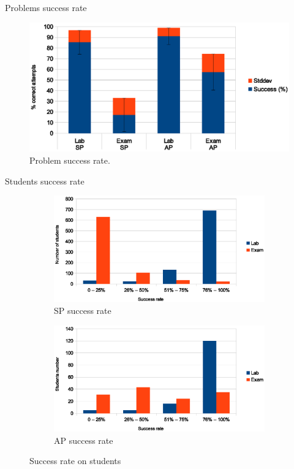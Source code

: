 \begin{frame}{Problems success rate}
    \begin{figure}
    \centering
        \includegraphics[width=.9\textwidth]{../code_usage/problems_success_rate}
        \caption{Problem success rate.}
        \label{fig:success_rate}
    \end{figure}
\end{frame}

\begin{frame}{Students success rate}
\begin{figure}
\centering
\begin{subfigure}{.5\textwidth}
  \centering
  \includegraphics[width=\linewidth]{../code_usage/sp_success_rate}
  \caption{SP success rate}
  \label{fig:sp_success_rate}
\end{subfigure}%
\begin{subfigure}{.5\textwidth}
  \centering
  \includegraphics[width=\linewidth]{../code_usage/ap_success_rate}
  \caption{AP success rate}
  \label{fig:ap_success_rate}
\end{subfigure}
\caption{Success rate on students}
\label{fig:students_success_rate}
\end{figure}
\end{frame}


